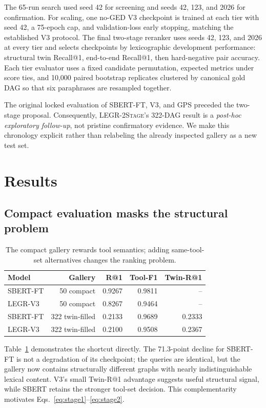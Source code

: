 \documentclass{article}
\makeatletter
\newcommand{\method}{\textsc{LEGR-2Stage}}
\newcommand{\sbert}{\textsc{SBERT-FT}}
\newcommand{\vthree}{\textsc{LEGR-V3}}
\newcommand{\Rone}{R@1}
\newcommand{\toolF}{Tool-F1}
\newcommand{\twR}{Twin-R@1}
\makeatother
\begin{document}
The 65-run search used seed 42 for screening and seeds 42, 123, and 2026 for confirmation.
For scaling, one no-GED V3 checkpoint is trained at each tier with seed 42, a 75-epoch cap, and validation-loss early stopping, matching the established V3 protocol.
The final two-stage reranker uses seeds 42, 123, and 2026 at every tier and selects checkpoints by lexicographic development performance: structural twin Recall@1, end-to-end Recall@1, then hard-negative pair accuracy.
Each tier evaluator uses a fixed candidate permutation, expected metrics under score ties, and 10,000 paired bootstrap replicates clustered by canonical gold DAG so that six paraphrases are resampled together.

The original locked evaluation of \sbert{}, V3, and GPS preceded the two-stage proposal.
Consequently, \method{}'s 322-DAG result is a \emph{post-hoc exploratory follow-up}, not pristine confirmatory evidence.
We make this chronology explicit rather than relabeling the already inspected gallery as a new test set.

\section{Results}
\label{sec:results}

\subsection{Compact evaluation masks the structural problem}

\begin{table}[t]
\caption{The compact gallery rewards tool semantics; adding same-tool-set alternatives changes the ranking problem.}
\label{tab:protocolshift}
\centering
\small
\begin{tabular}{lrrrr}
\toprule
Model & Gallery & \Rone{} & \toolF{} & \twR{} \\
\midrule
\sbert{} & 50 compact & 0.9267 & 0.9811 & -- \\
\vthree{} & 50 compact & 0.8267 & 0.9464 & -- \\
\midrule
\sbert{} & 322 twin-filled & 0.2133 & 0.9689 & 0.2333 \\
\vthree{} & 322 twin-filled & 0.2100 & 0.9508 & 0.2367 \\
\bottomrule
\end{tabular}
\end{table}

Table~\ref{tab:protocolshift} demonstrates the shortcut directly.
The 71.3-point decline for \sbert{} is not a degradation of its checkpoint; the queries are identical, but the gallery now contains structurally different graphs with nearly indistinguishable lexical content.
V3's small Twin-R@1 advantage suggests useful structural signal, while SBERT retains the stronger tool-set decision.
This complementarity motivates Eqs.~\ref{eq:stage1}--\ref{eq:stage2}.
\end{document}
